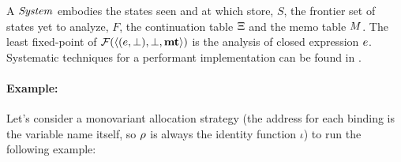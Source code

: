 A $\mathit{System}$ embodies the states seen and at which store, $S$, the frontier set of states yet to analyze, $F$, the continuation table $\Xi$ and the memo table $M$.
%
%
%
%
The least fixed-point of ${\mathcal F}(\langle (e,\bot),\bot,\mathbf{mt} \rangle)$ is the analysis of closed expression $e$.
%
Systematic techniques for a performant implementation can be found in \citet{ianjohnson:oaam:icfp2013}.

\paragraph{Example:} Let's consider a monovariant allocation strategy (the address for each binding is the variable name itself, so $\rho$ is always the identity function $\iota$) to run the following example:

